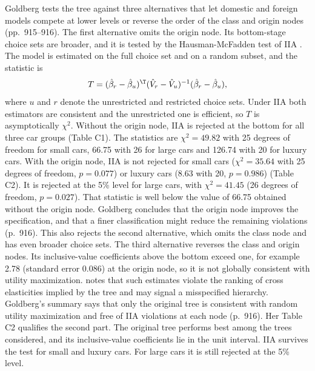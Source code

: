 Goldberg tests the tree against three alternatives that let domestic and foreign models compete at lower levels
or reverse the order of the class and origin nodes (pp.~915--916). The first alternative omits the origin node.
Its bottom-stage choice sets are broader, and it is tested by the Hausman-McFadden test of IIA
\citep{HausmanMcFadden1984}. The model is estimated on the full choice set and on a random subset, and the
statistic is
\begin{equation}\label{eq:08-gold-hm}
T = (\hat\beta_r - \hat\beta_u)^{\T}(\hat V_r - \hat V_u)^{-1}(\hat\beta_r - \hat\beta_u),
\end{equation}
where $u$ and $r$ denote the unrestricted and restricted choice sets. Under IIA both estimators are consistent
and the unrestricted one is efficient, so $T$ is asymptotically $\chi^2$. Without the origin node, IIA is
rejected at the bottom for all three car groups (Table C1). The statistics are $\chi^2 = 49.82$ with 25 degrees
of freedom for small cars, 66.75 with 26 for large cars and 126.74 with 20 for luxury cars. With the origin node, IIA is not rejected for small cars ($\chi^2 =
35.64$ with 25 degrees of freedom, $p = 0.077$) or luxury cars (8.63 with 20, $p = 0.986$) (Table C2). It is
rejected at the 5\% level for large cars, with $\chi^2 = 41.45$ (26 degrees of freedom, $p = 0.027$). That
statistic is well below the value of 66.75 obtained without the origin node. Goldberg concludes that the origin
node improves the specification, and that a finer classification might reduce the remaining violations (p.~916).
This also rejects the second alternative,
which omits the class node and has even broader choice sets. The third alternative reverses the class and origin
nodes. Its inclusive-value coefficients above the bottom exceed one, for example 2.78 (standard error 0.086) at
the origin node, so it is not globally consistent with utility maximization. \citet[pp.~1425--1426]{McFadden1984}
notes that such estimates violate the ranking of cross elasticities implied by the tree and may signal a
misspecified hierarchy. Goldberg's summary says that only the original tree is consistent with random utility
maximization and free of IIA violations at each node (p.~916). Her Table C2 qualifies the second part. The
original tree performs best among the trees considered, and its inclusive-value coefficients lie in the unit
interval. IIA survives the test for small and luxury cars. For large cars it is still rejected at the 5\% level.

